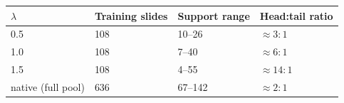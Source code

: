 \begin{tabular}{llll}
\toprule
$\lambda$ & Training slides & Support range & Head:tail ratio\\
\midrule
0.5 & 108 & 10--26 & ${\approx}3{:}1$\\
1.0 & 108 & 7--40 & ${\approx}6{:}1$\\
1.5 & 108 & 4--55 & ${\approx}14{:}1$\\
native (full pool) & 636 & 67--142 & ${\approx}2{:}1$\\
\bottomrule
\end{tabular}

